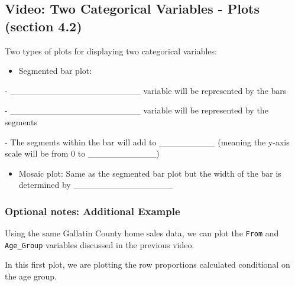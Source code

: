 \documentclass[
]{report}
\providecommand{\tightlist}{%
  \setlength{\itemsep}{0pt}\setlength{\parskip}{0pt}}
\newcommand{\rgi}{\hspace{24pt}}  %
\begin{document}
\vspace{0.5in}

\subsection*{Video: Two Categorical Variables - Plots (section 4.2)}\label{video-two-categorical-variables---plots-section-4.2}

Two types of plots for displaying two categorical variables:


\begin{itemize}
\tightlist
\item
  Segmented bar plot:
\end{itemize}

\rgi \rgi - \_\_\_\_\_\_\_\_\_\_\_\_\_\_\_\_\_\_\_\_\_ variable will be represented by the bars

\rgi \rgi - \_\_\_\_\_\_\_\_\_\_\_\_\_\_\_\_\_\_\_\_\_ variable will be represented by the segments

\rgi \rgi - The segments within the bar will add to \_\_\_\_\_\_\_\_\_ (meaning the y-axis scale will be from 0 to \_\_\_\_\_\_\_\_\_\_\_)

\begin{itemize}
\tightlist
\item
  Mosaic plot: Same as the segmented bar plot but the width of the bar is determined by \_\_\_\_\_\_\_\_\_\_\_\_\_\_\_\_
\end{itemize}

\vspace{0.4in}


\subsubsection*{Optional notes: Additional Example}\label{optional-notes-additional-example-9}

Using the same Gallatin County home sales data, we can plot the \texttt{From} and \texttt{Age\_Group} variables discussed in the previous video.

In this first plot, we are plotting the row proportions calculated conditional on the age group.
\end{document}
